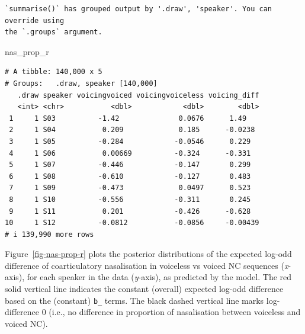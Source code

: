 \documentclass[
  authoryear,
  preprint,
  3p]{elsarticle}
\newenvironment{Shaded}{\begin{snugshade}}{\end{snugshade}}
\newcommand{\AttributeTok}[1]{\textcolor[rgb]{0.40,0.45,0.13}{#1}}
\newcommand{\DecValTok}[1]{\textcolor[rgb]{0.68,0.00,0.00}{#1}}
\newcommand{\FloatTok}[1]{\textcolor[rgb]{0.68,0.00,0.00}{#1}}
\newcommand{\FunctionTok}[1]{\textcolor[rgb]{0.28,0.35,0.67}{#1}}
\newcommand{\NormalTok}[1]{\textcolor[rgb]{0.00,0.23,0.31}{#1}}
\newcommand{\SpecialCharTok}[1]{\textcolor[rgb]{0.37,0.37,0.37}{#1}}
\newcommand{\StringTok}[1]{\textcolor[rgb]{0.13,0.47,0.30}{#1}}
\begin{document}
\begin{verbatim}
`summarise()` has grouped output by '.draw', 'speaker'. You can override using
the `.groups` argument.
\end{verbatim}

\begin{Shaded}
\begin{Highlighting}[]
\NormalTok{nas\_prop\_r}
\end{Highlighting}
\end{Shaded}

\begin{verbatim}
# A tibble: 140,000 x 5
# Groups:   .draw, speaker [140,000]
   .draw speaker voicingvoiced voicingvoiceless voicing_diff
   <int> <chr>           <dbl>            <dbl>        <dbl>
 1     1 S03          -1.42              0.0676      1.49   
 2     1 S04           0.209             0.185      -0.0238 
 3     1 S05          -0.284            -0.0546      0.229  
 4     1 S06           0.00669          -0.324      -0.331  
 5     1 S07          -0.446            -0.147       0.299  
 6     1 S08          -0.610            -0.127       0.483  
 7     1 S09          -0.473             0.0497      0.523  
 8     1 S10          -0.556            -0.311       0.245  
 9     1 S11           0.201            -0.426      -0.628  
10     1 S12          -0.0812           -0.0856     -0.00439
# i 139,990 more rows
\end{verbatim}

Figure~\ref{fig-nas-prop-r} plots the posterior distributions of the
expected log-odd difference of coarticulatory nasalisation in voiceless
vs voiced NC sequences (\emph{x}-axis), for each speaker in the data
(\emph{y}-axis), as predicted by the model. The red solid vertical line
indicates the constant (overall) expected log-odd difference based on
the (constant) \texttt{b\_} terms. The black dashed vertical line marks
log-difference 0 (i.e., no difference in proportion of nasalisation
between voiceless and voiced NC).

\begin{Shaded}
\end{Shaded}
\end{document}
